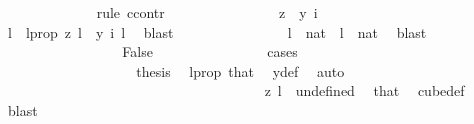 \begin{isabellebody}
\ \ \ \ \ \ \ \ \ \ \ \ \isamarkupfalse%
\ {\isacharparenleft}{\kern0pt}rule\ ccontr{\isacharparenright}{\kern0pt}\isanewline
\ \ \ \ \ \ \ \ \ \ \ \ \ \ \isamarkupfalse%
\ {\isachardoublequoteopen}z\ {\isasymnoteq}\ y\ i{\isachardoublequoteclose}\ \isanewline
\ \ \ \ \ \ \ \ \ \ \ \ \ \ \isamarkupfalse%
\ \isamarkupfalse%
\ l\ \ l{\isacharunderscore}{\kern0pt}prop{\isacharcolon}{\kern0pt}\ {\isachardoublequoteopen}z\ l\ {\isasymnoteq}\ y\ i\ l{\isachardoublequoteclose}\ \isamarkupfalse%
\ blast\isanewline
\ \ \ \ \ \ \ \ \ \ \ \ \ \ \isamarkupfalse%
\ {\isachardoublequoteopen}l\ {\isasymin}\ {\isacharbraceleft}{\kern0pt}{\isachardot}{\kern0pt}{\isachardot}{\kern0pt}{\isacharless}{\kern0pt}{}{\isacharcolon}{\kern0pt}{\isacharcolon}{\kern0pt}nat{\isacharbraceright}{\kern0pt}{\isachardoublequoteclose}\ {\isacharbar}{\kern0pt}\ {\isachardoublequoteopen}l\ {\isasymnotin}\ {\isacharbraceleft}{\kern0pt}{\isachardot}{\kern0pt}{\isachardot}{\kern0pt}{\isacharless}{\kern0pt}{}{\isacharcolon}{\kern0pt}{\isacharcolon}{\kern0pt}nat{\isacharbraceright}{\kern0pt}{\isachardoublequoteclose}\ \isamarkupfalse%
\ blast\isanewline
\ \ \ \ \ \ \ \ \ \ \ \ \ \ \isamarkupfalse%
\ \isamarkupfalse%
\ False\isanewline
\ \ \ \ \ \ \ \ \ \ \ \ \ \ \isamarkupfalse%
\ cases\isanewline
\ \ \ \ \ \ \ \ \ \ \ \ \ \ \ \ \isamarkupfalse%
\ {}\isanewline
\ \ \ \ \ \ \ \ \ \ \ \ \ \ \ \ \isamarkupfalse%
\ \isamarkupfalse%
\ {\isacharquery}{\kern0pt}thesis\ \isamarkupfalse%
\ l{\isacharunderscore}{\kern0pt}prop\ that{\isacharparenleft}{\kern0pt}{}{\isacharparenright}{\kern0pt}\ \isamarkupfalse%
\ y{\isacharunderscore}{\kern0pt}def\ \isamarkupfalse%
\ auto\isanewline
\ \ \ \ \ \ \ \ \ \ \ \ \ \ \isamarkupfalse%
\isanewline
\ \ \ \ \ \ \ \ \ \ \ \ \ \ \ \ \isamarkupfalse%
\ {}\isanewline
\ \ \ \ \ \ \ \ \ \ \ \ \ \ \ \ \isamarkupfalse%
\ \isamarkupfalse%
\ {\isachardoublequoteopen}z\ l\ {\isacharequal}{\kern0pt}\ undefined{\isachardoublequoteclose}\ \isamarkupfalse%
\ that\ \isamarkupfalse%
\ cube{\isacharunderscore}{\kern0pt}def\ \isamarkupfalse%
\ blast\isanewline
\ \ \ \ \ \ \ \ \ \ \ \ \ \ \ \ \isamarkupfalse%

\end{isabellebody}
